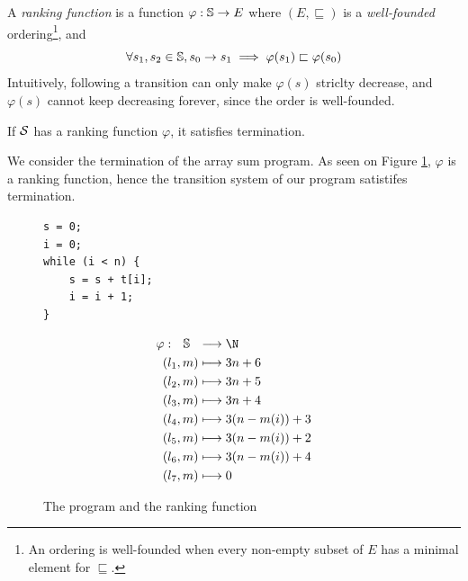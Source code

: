 \documentclass[toc, titlepaged]{../cs-classes/cs-classes}
\begin{document}
\begin{definition}
    A \emph{ranking function} is a function $\varphi:\S\to E$ where $(E, \sqsubseteq)$ is a \emph{well-founded} ordering\footnote{An ordering is well-founded when every non-empty subset of $E$ has a minimal element for $\sqsubseteq$.}, and
    \begin{equation*}
        \forall s_1, s_2\in\S, s_0\to s_1 \implies \varphi(s_1) \sqsubset \varphi(s_0)
    \end{equation*}
    Intuitively, following a transition can only make $\varphi(s)$ striclty decrease, and $\varphi(s)$ cannot keep decreasing forever, since the order is well-founded.
\end{definition}

\begin{theorem}
    If $\Sc$ has a ranking function $\varphi$, it satisfies termination.
\end{theorem}

\begin{example}
    We consider the termination of the array sum program. As seen on Figure \ref{fig:ranking-function}, $\varphi$ is a ranking function, hence the transition system of our program satistifes termination.
    \begin{figure}[!ht]
        \label{fig:ranking-function}
        \centering
        \begin{minipage}{0.2\textwidth}
            \baselineskip
            \centering
            \begin{verbatim}
s = 0;
i = 0;
while (i < n) {
    s = s + t[i];
    i = i + 1;
}
            \end{verbatim}
        \end{minipage}
        \begin{minipage}{.4\textwidth}
          \begin{equation*}
            \begin{aligned}
                \varphi : \:\:\: \S \:\:\: &\longrightarrow \N\\
                (l_1, m) &\longmapsto 3n+6\\
                (l_2, m) &\longmapsto 3n+5\\
                (l_3, m) &\longmapsto 3n+4\\
                (l_4, m) &\longmapsto 3(n-m(i))+3\\
                (l_5, m) &\longmapsto 3(n-m(i))+2\\
                (l_6, m) &\longmapsto 3(n-m(i))+4\\
                (l_7, m) &\longmapsto 0\\
            \end{aligned}
          \end{equation*}
        \end{minipage}
        \caption{The program and the ranking function}
    \end{figure}
\end{example}
\end{document}
